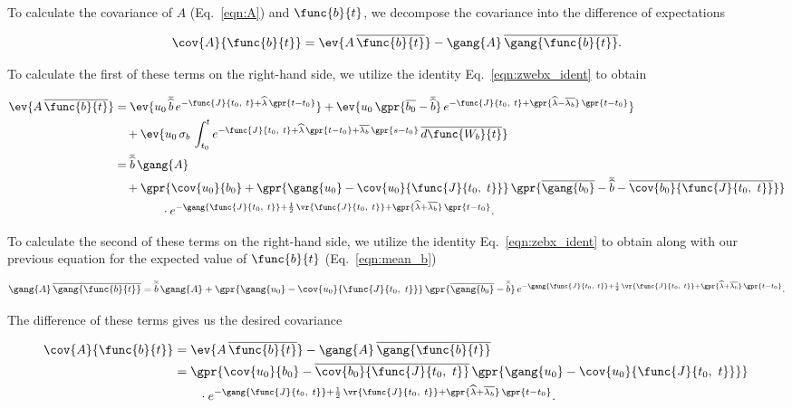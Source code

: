 To calculate the covariance of $A$ (Eq.~\ref{eqn:A}) and $\func{b}{t}$, we decompose the covariance into the difference of expectations

\begin{equation}
	\cov{A}{\func{b}{t}} = \ev{A\,\overline{\func{b}{t}}} - \gang{A}\,\overline{\gang{\func{b}{t}}}.
\end{equation}

To calculate the first of these terms on the right-hand side, we utilize the identity Eq.~\ref{eqn:zwebx_ident} to obtain

\begin{align}
	\ev{A\,\overline{\func{b}{t}}} &= \ev{u_0\,\overline{\widehat{b}}\,e^{-\func{J}{t_0,\ t} + \widehat{\lambda}\,\gpr{t - t_0}}} + \ev{u_0\,\gpr{\overline{b_0} - \overline{\widehat{b}}}\,e^{-\func{J}{t_0,\ t} + \gpr{\widehat{\lambda} - \overline{\lambda_b}}\,\gpr{t - t_0}}} \nonumber \\
			&\quad + \ev{u_0\,\sigma_b\,\int_{t_0}^{t} e^{-\func{J}{t_0,\ t} + \widehat{\lambda}\,\gpr{t - t_0} + \overline{\lambda_b}\,\gpr{s - t_0}}\,\overline{d\func{W_b}{t}}} \nonumber \\
		&= \overline{\widehat{b}}\,\gang{A} \nonumber \\
			&\quad + \gpr{\cov{u_0}{b_0} + \gpr{\gang{u_0} - \cov{u_0}{\func{J}{t_0,\ t}}}\,\gpr{\overline{\gang{b_0}} - \overline{\widehat{b}} - \overline{\cov{b_0}{\func{J}{t_0,\ t}}}}} \nonumber \\
			&\qquad\qquad \cdot e^{-\gang{\func{J}{t_0,\ t}} + \frac{1}{2}\,\vr{\func{J}{t_0,\ t}} + \gpr{\widehat{\lambda} + \overline{\lambda_b}}\,\gpr{t - t_0}}.
\end{align}

To calculate the second of these terms on the right-hand side, we utilize the identity Eq.~\ref{eqn:zebx_ident} to obtain along with our previous equation for the expected value of $\func{b}{t}$ (Eq.~\ref{eqn:mean_b})

\begin{equation}
	\gang{A}\,\overline{\gang{\func{b}{t}}} = \overline{\widehat{b}}\,\gang{A} + \gpr{\gang{u_0} - \cov{u_0}{\func{J}{t_0,\ t}}}\,\gpr{\overline{\gang{b_0}} - \overline{\widehat{b}}}\,e^{-\gang{\func{J}{t_0,\ t}} + \frac{1}{2}\,\vr{\func{J}{t_0,\ t}} + \gpr{\widehat{\lambda} + \overline{\lambda_b}}\,\gpr{t - t_0}}.
\end{equation}

The difference of these terms gives us the desired covariance

\begin{align}
	\cov{A}{\func{b}{t}} &= \ev{A\,\overline{\func{b}{t}}} - \gang{A}\,\overline{\gang{\func{b}{t}}} \nonumber \\
		&= \gpr{\cov{u_0}{b_0} - \overline{\cov{b_0}{\func{J}{t_0,\ t}}}\,\gpr{\gang{u_0} - \cov{u_0}{\func{J}{t_0,\ t}}}}\, \nonumber \\
			&\qquad \cdot e^{-\gang{\func{J}{t_0,\ t}} + \frac{1}{2}\,\vr{\func{J}{t_0,\ t}} + \gpr{\widehat{\lambda} + \overline{\lambda_b}}\,\gpr{t - t_0}}. \label{eqn:cov_A_b}
\end{align}

